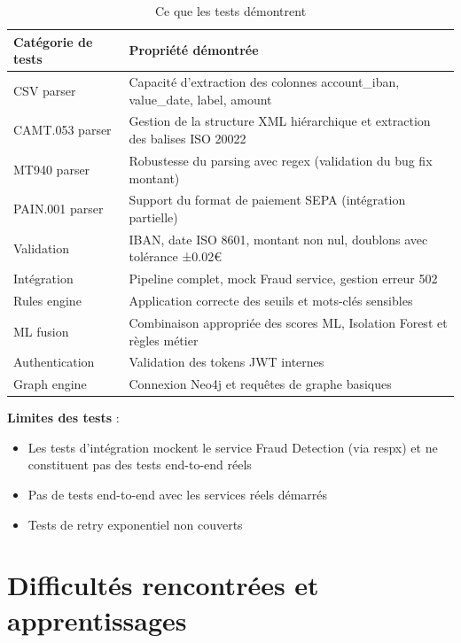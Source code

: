 \documentclass[12pt,a4paper]{extreport}
\begin{document}
\begin{table}[!htbp]
\centering
\caption{Ce que les tests démontrent}
\label{tab:test-value}
\small
\begin{tabularx}{0.95\textwidth}{|
    >{\raggedright\arraybackslash}p{3cm}|
    >{\raggedright\arraybackslash}X|}
\hline
\textbf{Catégorie de tests} & \textbf{Propriété démontrée} \\
\hline
CSV parser & Capacité d'extraction des colonnes account\_iban, value\_date, label, amount \\
CAMT.053 parser & Gestion de la structure XML hiérarchique et extraction des balises ISO 20022 \\
MT940 parser & Robustesse du parsing avec regex (validation du bug fix montant) \\
PAIN.001 parser & Support du format de paiement SEPA (intégration partielle) \\
Validation & IBAN, date ISO 8601, montant non nul, doublons avec tolérance ±0.02€ \\
Intégration & Pipeline complet, mock Fraud service, gestion erreur 502 \\
Rules engine & Application correcte des seuils et mots-clés sensibles \\
ML fusion & Combinaison appropriée des scores ML, Isolation Forest et règles métier \\
Authentication & Validation des tokens JWT internes \\
Graph engine & Connexion Neo4j et requêtes de graphe basiques \\
\hline
\end{tabularx}
\end{table}

\textbf{Limites des tests} :
\begin{itemize}
    \item Les tests d'intégration mockent le service Fraud Detection (via respx) et ne constituent pas des tests end-to-end réels
    \item Pas de tests end-to-end avec les services réels démarrés
    \item Tests de retry exponentiel non couverts
\end{itemize}

\chapter{Difficultés rencontrées et apprentissages}
\end{document}
